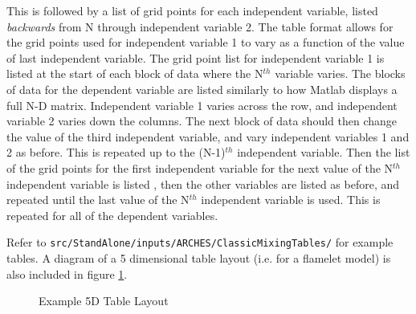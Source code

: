 This is followed by a list of grid points for each independent variable, listed \textit{backwards} from N through independent variable 2. The table format allows for the grid points used for independent variable 1 to vary as a function of the value of last independent variable. The grid point list for independent variable 1 is listed at the start of each block of data where the N$^{th}$ variable varies.  The blocks of data for the dependent variable are listed similarly to how Matlab displays a full N-D matrix.  Independent  variable 1 varies across the row, and independent variable 2 varies down the columns.  The next block of data should then change the value of the third independent variable, and vary independent variables 1 and 2 as before.  This is repeated up to the (N-1)$^{th}$ independent variable.  Then the list of the grid points for the first independent variable for the next value of the N$^{th}$ independent variable is listed , then the other variables are listed as before, and repeated until the last value of the N$^{th}$ independent variable is used.  This is repeated for all of the dependent variables.

Refer to \verb=src/StandAlone/inputs/ARCHES/ClassicMixingTables/= for example tables.  A diagram of a 5 dimensional table layout (i.e. for a flamelet model) is also included in figure \ref{fig:table_ex}.

\newpage
\begin{figure}[H]
 \begin{center}
   \caption{Example 5D Table Layout}\label{fig:table_ex}
   \end{center}
\end{figure}






